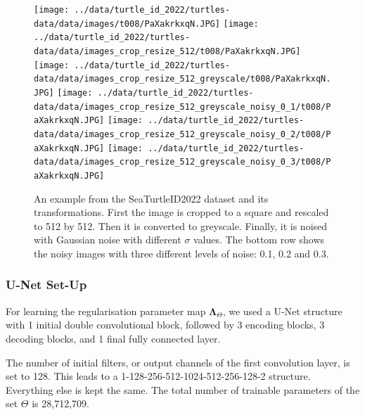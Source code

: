 \documentclass[12pt]{article}
\begin{document}
\begin{figure}[H]
    \centering
    \texttt{[image: ../data/turtle\_id\_2022/turtles-data/data/images/t008/PaXakrkxqN.JPG]}
    \texttt{[image: ../data/turtle\_id\_2022/turtles-data/data/images\_crop\_resize\_512/t008/PaXakrkxqN.JPG]}
    \texttt{[image: ../data/turtle\_id\_2022/turtles-data/data/images\_crop\_resize\_512\_greyscale/t008/PaXakrkxqN.JPG]}
    \texttt{[image: ../data/turtle\_id\_2022/turtles-data/data/images\_crop\_resize\_512\_greyscale\_noisy\_0\_1/t008/PaXakrkxqN.JPG]}
    \texttt{[image: ../data/turtle\_id\_2022/turtles-data/data/images\_crop\_resize\_512\_greyscale\_noisy\_0\_2/t008/PaXakrkxqN.JPG]}
    \texttt{[image: ../data/turtle\_id\_2022/turtles-data/data/images\_crop\_resize\_512\_greyscale\_noisy\_0\_3/t008/PaXakrkxqN.JPG]}
    \caption{
    An example from the SeaTurtleID2022 dataset and its transformations.
    First the image is cropped to a square and rescaled to 512 by 512.
    Then it is converted to greyscale.
    Finally, it is noised with Gaussian noise with different $\sigma$ values.
    The bottom row shows the noisy images with three different levels of noise: 0.1, 0.2 and 0.3.
    }
    \label{fig:example_turtle_images}

\end{figure}


\subsubsection{U-Net Set-Up}


For learning the regularisation parameter map $\mathbf{\Lambda}_{\Theta}$, we used a U-Net structure with 1 initial double convolutional block, followed by 3 encoding blocks, 3 decoding blocks, and 1 final fully connected layer.

The number of initial filters, or output channels of the first convolution layer, is set to 128.
This leads to a 1-128-256-512-1024-512-256-128-2 structure.
Everything else is kept the same.
The total number of trainable parameters of the set $\Theta$ is 28,712,709.
\end{document}
